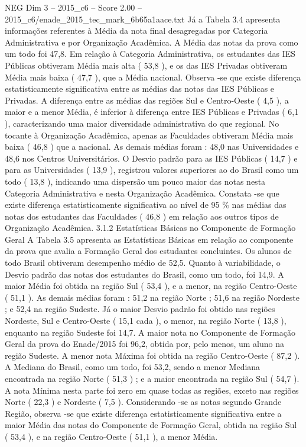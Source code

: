 \begin{textsample}{NEG Dim 3 – 2015\_c6 – Score 2.00 – 2015\_c6/enade\_2015\_tec\_mark\_6b65a1aace.txt}
Já a Tabela 3.4 apresenta informações referentes à Média da nota final desagregadas por Categoria Administrativa e por Organização Acadêmica.
A Média das notas da prova como um todo foi 47,8.
Em relação à Categoria Administrativa, os estudantes das IES Públicas obtiveram Média mais alta ( 53,8 ), e os das IES Privadas obtiveram Média mais baixa ( 47,7 ), que a Média nacional.
Observa -se que existe diferença estatisticamente significativa entre as médias das notas das IES Públicas e Privadas.
A diferença entre as médias das regiões Sul e Centro-Oeste ( 4,5 ), a maior e a menor Média, é inferior à diferença entre IES Públicas e Privadas ( 6,1 ), caracterizando uma maior diversidade administrativa do que regional.
No tocante à Organização Acadêmica, apenas as Faculdades obtiveram Média mais baixa ( 46,8 ) que a nacional.
As demais médias foram : 48,0 nas Universidades e 48,6 nos Centros Universitários.
O Desvio padrão para as IES Públicas ( 14,7 ) e para as Universidades ( 13,9 ), registrou valores superiores ao do Brasil como um todo ( 13,8 ), indicando uma dispersão um pouco maior das notas nesta Categoria Administrativa e nesta Organização Acadêmica.
Constata -se que existe diferença estatisticamente significativa ao nível de 95 \% nas médias das notas dos estudantes das Faculdades ( 46,8 ) em relação aos outros tipos de Organização Acadêmica. 3.1.2 Estatísticas Básicas no Componente de Formação Geral A Tabela 3.5 apresenta as Estatísticas Básicas em relação ao componente da prova que avalia a Formação Geral dos estudantes concluintes.
Os alunos de todo Brasil obtiveram desempenho médio de 52,5.
Quanto à variabilidade, o Desvio padrão das notas dos estudantes do Brasil, como um todo, foi 14,9.
A maior Média foi obtida na região Sul ( 53,4 ), e a menor, na região Centro-Oeste ( 51,1 ).
As demais médias foram : 51,2 na região Norte ; 51,6 na região Nordeste ; e 52,4 na região Sudeste.
Já o maior Desvio padrão foi obtido nas regiões Nordeste, Sul e Centro-Oeste ( 15,1 cada ), o menor, na região Norte ( 13,8 ), enquanto na região Sudeste foi 14,7.
A maior nota no Componente de Formação Geral da prova do Enade/2015 foi 96,2, obtida por, pelo menos, um aluno na região Sudeste.
A menor nota Máxima foi obtida na região Centro-Oeste ( 87,2 ).
A Mediana do Brasil, como um todo, foi 53,2, sendo a menor Mediana encontrada na região Norte ( 51,3 ) ; e a maior encontrada na região Sul ( 54,7 ).
A nota Mínima nesta parte foi zero em quase todas as regiões, exceto nas regiões Norte ( 22,3 ) e Nordeste ( 7,5 ).
Considerando -se as notas segundo Grande Região, observa -se que existe diferença estatisticamente significativa entre a maior Média das notas do Componente de Formação Geral, obtida na região Sul ( 53,4 ), e na região Centro-Oeste ( 51,1 ), a menor Média.

\end{textsample}
